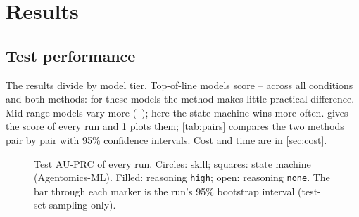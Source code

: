 \section{Results}\label{sec:results}

\subsection{Test performance}

The results divide by model tier. Top-of-line models score \FlagScoreMin--\FlagScoreMax{} across all
conditions and both methods: for these models the method makes little practical difference. Mid-range models
vary more (\SmallScoreMin--\SmallScoreMax); here the state machine wins more often.  gives the score of every run and \cref{fig:scores}
plots them; \cref{tab:pairs} compares the two methods pair by pair with 95\% confidence intervals. Cost and time are
in \cref{sec:cost}.

\begin{table}[tbp]\centering\small
\caption{Test AU-PRC (average precision) by model, method and reasoning effort. Each model's best run is marked in
bold; the best overall is marked bold and underlined. $^{\dagger}$: a repeated run (\cref{sec:repeats}).
$^{\ddagger}$: test predictions produced by hand from the run's selected model (\cref{sec:limitations}).}
\label{tab:matrix}
\MatrixTable
\end{table}

\begin{figure}[tbp]\centering

\caption{Test AU-PRC of every run. Circles: skill; squares: state machine (Agentomics-ML). Filled: reasoning \texttt{high}; open: reasoning \texttt{none}. The bar through each marker is the run's 95\% bootstrap
interval (test-set sampling only).}
\label{fig:scores}
\end{figure}


\begin{table}[tbp]\centering\small
\caption{Paired comparison on the test set. SM: state machine (Agentomics-ML). $\Delta$: SM minus skill. 95\% CI:
percentile interval over 2,000 paired bootstrap resamples; $\Delta$ in bold where the interval excludes zero.
The interval reflects test-set sampling only, not run-to-run variation (\cref{sec:limitations}). $^{\dagger}$,
$^{\ddagger}$: as in \cref{tab:matrix}.}
\label{tab:pairs}
\PairTable\\[0.4em]
\PairTableNote
\end{table}

